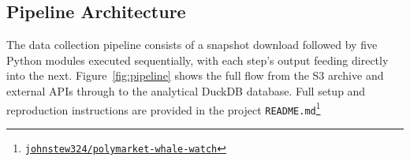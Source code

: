 \documentclass[11pt,a4paper]{article}
\begin{document}
\newpage
\subsection{Pipeline Architecture}
\label{sec:pipeline}

The data collection pipeline consists of a snapshot download followed
by five Python modules executed sequentially, with each step's output
feeding directly into the next.
Figure~\ref{fig:pipeline} shows the full flow from the S3 archive and
external APIs through to the analytical DuckDB database.
Full setup and reproduction instructions are provided in the project
\texttt{README.md}\footnote{\href{https://github.com/johnstew324/polymarket-whale-watch}{%
\faGithub\;\texttt{johnstew324/polymarket-whale-watch}}}
\end{document}
